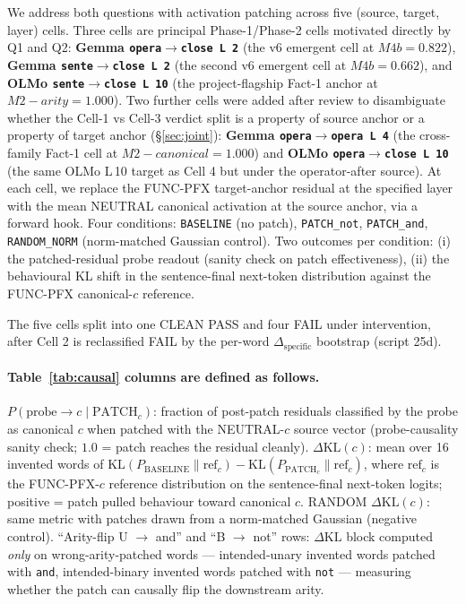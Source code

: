 \documentclass[11pt,letterpaper]{article}
\newcommand{\dkl}{\ensuremath{\Delta\mathrm{KL}}}
\newcommand{\dspec}{\ensuremath{\Delta_{\text{specific}}}}
\newcommand{\Mc}{M2-canonical}
\newcommand{\Ma}{M2-arity}
\newcommand{\Mbfb}{M4b}
\begin{document}
We address both questions with activation patching across five
(source, target, layer) cells. Three cells are principal
Phase-1/Phase-2 cells motivated directly by Q1 and Q2:
\textbf{Gemma \texttt{opera$\to$close L\,2}} (the v6 emergent cell
at $\Mbfb = 0.822$), \textbf{Gemma \texttt{sente$\to$close L\,2}}
(the second v6 emergent cell at $\Mbfb = 0.662$), and
\textbf{OLMo \texttt{sente$\to$close L\,10}} (the project-flagship
Fact-1 anchor at $\Ma = 1.000$). Two further cells were added after
review to disambiguate whether the Cell-1 vs Cell-3 verdict split is
a property of source anchor or a property of target anchor
(\S\ref{sec:joint}):
\textbf{Gemma \texttt{opera$\to$opera L\,4}} (the cross-family
Fact-1 cell at $\Mc = 1.000$) and
\textbf{OLMo \texttt{opera$\to$close L\,10}} (the same OLMo L\,10
target as Cell 4 but under the operator-after source). At each
cell, we replace the FUNC-PFX target-anchor residual at the
specified layer with the mean NEUTRAL canonical activation at the
source anchor, via a forward hook. Four conditions:
\texttt{BASELINE} (no patch), \texttt{PATCH\_not},
\texttt{PATCH\_and}, \texttt{RANDOM\_NORM} (norm-matched Gaussian
control). Two outcomes per condition: (i) the patched-residual
probe readout (sanity check on patch effectiveness), (ii) the
behavioural KL shift in the sentence-final next-token distribution
against the FUNC-PFX canonical-$c$ reference.

The five cells split into one CLEAN PASS and four FAIL under
intervention, after Cell 2 is reclassified FAIL by the per-word
\dspec{} bootstrap (script 25d).

\paragraph{Table~\ref{tab:causal} columns are defined as follows.}
$P(\text{probe} \to c \mid \text{PATCH}_c)$: fraction of post-patch
residuals classified by the probe as canonical $c$ when patched with
the NEUTRAL-$c$ source vector (probe-causality sanity check; $1.0$
= patch reaches the residual cleanly). $\dkl(c)$: mean over 16
invented words of
$\mathrm{KL}(P_{\text{BASELINE}} \| \text{ref}_c) -
\mathrm{KL}(P_{\text{PATCH}_c} \| \text{ref}_c)$,
where $\text{ref}_c$ is the FUNC-PFX-$c$ reference distribution on
the sentence-final next-token logits; positive = patch pulled
behaviour toward canonical $c$. RANDOM $\dkl(c)$: same metric with
patches drawn from a norm-matched Gaussian (negative control).
``Arity-flip U $\to$ and'' and ``B $\to$ not'' rows: \dkl{} block
computed \emph{only} on wrong-arity-patched words ---
intended-unary invented words patched with \texttt{and},
intended-binary invented words patched with \texttt{not} ---
measuring whether the patch can causally flip the downstream arity.
\end{document}
